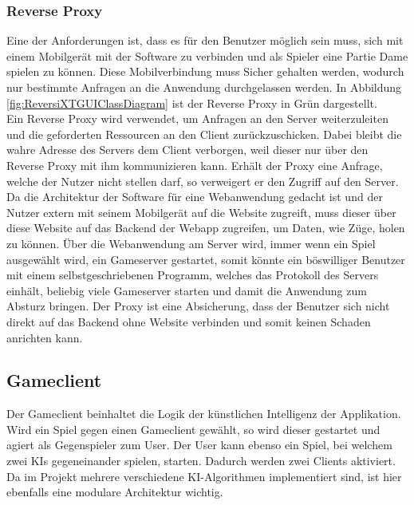 \documentclass[12pt,a4paper,bibliography=totocnumbered,listof=totocnumbered]{article}
\begin{document}
\subsubsection{Reverse Proxy}
Eine der Anforderungen ist, dass es für den Benutzer möglich sein muss, sich mit einem Mobilgerät mit der Software zu verbinden und als Spieler eine
Partie Dame spielen zu können. Diese Mobilverbindung muss Sicher gehalten werden, wodurch nur bestimmte Anfragen an die Anwendung durchgelassen werden.
In Abbildung \ref{fig:ReversiXTGUIClassDiagram} ist der Reverse Proxy in Grün dargestellt.
\\ 
Ein Reverse Proxy wird verwendet, um Anfragen an den Server weiterzuleiten und die geforderten Ressourcen an den Client zurückzuschicken. Dabei 
bleibt die wahre Adresse des Servers dem Client verborgen, weil dieser nur über den Reverse Proxy mit ihm kommunizieren kann.
Erhält der Proxy eine Anfrage, welche der Nutzer nicht stellen darf, so verweigert er den Zugriff auf den Server.
\\
Da die Architektur der Software für eine Webanwendung gedacht ist und der Nutzer extern mit seinem Mobilgerät auf die Website zugreift, 
muss dieser über diese Website auf das Backend der Webapp zugreifen, um Daten, wie Züge, holen zu können.
Über die Webanwendung am Server wird, immer wenn ein Spiel ausgewählt wird, ein Gameserver gestartet, somit könnte ein böswilliger Benutzer
mit einem selbstgeschriebenen Programm, welches das Protokoll des Servers einhält, beliebig viele Gameserver starten und damit die 
Anwendung zum Absturz bringen.
Der Proxy ist eine Absicherung, dass der Benutzer sich nicht direkt auf das Backend ohne Website verbinden und somit 
keinen Schaden anrichten kann. 

\subsection{Gameclient}
Der Gameclient beinhaltet die Logik der künstlichen Intelligenz der Applikation. Wird ein Spiel gegen einen Gameclient gewählt, so wird dieser gestartet und agiert als 
Gegenspieler zum User. Der User kann ebenso ein Spiel, bei welchem zwei \ac{KI}s gegeneinander spielen, starten. Dadurch werden zwei Clients aktiviert.
Da im Projekt mehrere verschiedene \ac{KI}-Algorithmen implementiert sind, ist hier ebenfalls eine modulare Architektur wichtig.
\end{document}
